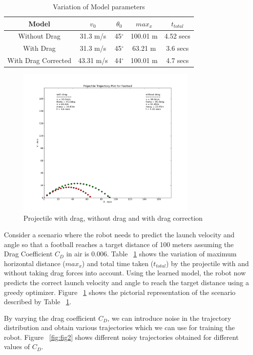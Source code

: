 \documentclass[conference]{IEEEtran}
\begin{document}
\begin{table}[t]\renewcommand{\arraystretch}{1.5}\addtolength{\tabcolsep}{-1pt}
\centering
\caption{Variation of Model parameters}
\begin{tabular}{  | c | c | c | c | c |}
  \hline
  Model & $v_{0}$ & $\theta_{0}$ & $max_{x}$ & $t_{total}$\\
  \hline 
  Without Drag  & 31.3 m/s  & 45$^{\circ}$ & 100.01 m & 4.52 secs  \\ 
  \hline
  With Drag  & 31.3 m/s  & 45$^{\circ}$ & 63.21 m & 3.6 secs  \\
  \hline
  With Drag Corrected  & 43.31 m/s  & 44$^{\circ}$ & 100.01 m & 4.7 secs  \\
  \hline
\end{tabular}
\label{tab:tab1}
\end{table}

\begin{figure}[!t]
\centering
\includegraphics[width=3.5in]{fig1}
\caption{Projectile with drag, without drag and with drag correction}
\label{fig:fig1}
\end{figure}

Consider a scenario where the robot needs to predict the launch velocity and angle so that a football reaches a target distance of 100 meters assuming the Drag Coefficient $C_{D}$ in air is 0.006.  Table ~\ref{tab:tab1} shows the variation of maximum horizontal distance ($max_{x}$) and total time taken ($t_{total}$) by the projectile with and without taking drag forces into account. Using the learned model, the robot now predicts the correct launch velocity and angle to reach the target distance using a greedy optimizer. Figure ~\ref{fig:fig1} shows the pictorial representation of the scenario described by Table ~\ref{tab:tab1}.  

By varying the drag coefficient $C_{D}$, we can introduce noise in the trajectory distribution and obtain various trajectories which we can use for training the robot. Figure ~\ref{fig:fig2} shows different noisy trajectories obtained for different values of $C_{D}$.
\end{document}

